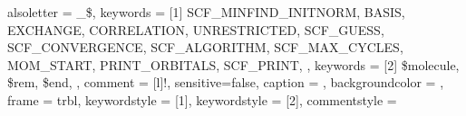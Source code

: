 

{
	alsoletter = {_\$},
	keywords = [1]{
		SCF_MINFIND_INITNORM,
		BASIS,
		EXCHANGE,
		CORRELATION,
		UNRESTRICTED,
		SCF_GUESS,
		SCF_CONVERGENCE,
		SCF_ALGORITHM,
		SCF_MAX_CYCLES,
		MOM_START,
		PRINT_ORBITALS,
		SCF_PRINT,
	},
	keywords = [2]{
		\$molecule,
		\$rem,
		\$end,
	},
	comment = [l]{!},
	sensitive=false, %
	caption = \lstname,
	backgroundcolor = \color{Cornsilk},
	frame = trbl,
	keywordstyle = [1]{\color{eclipsePurple}},
	keywordstyle = [2]{\color{Navy}},
	commentstyle = \color{eclipseGreen}
}

